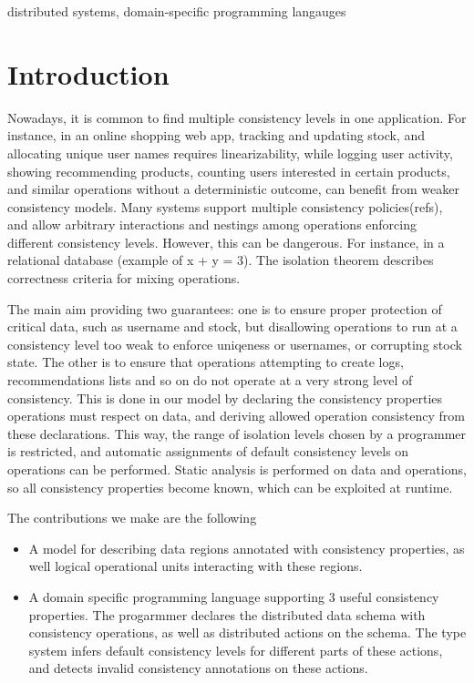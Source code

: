 \documentclass[preprint, numbers]{sigplanconf}
\begin{document}


\keywords
distributed systems, domain-specific programming langauges

\section{Introduction}
Nowadays, it is common to find multiple consistency levels in one application. For instance, in an online 
shopping web app, tracking and updating stock, and allocating unique user names requires linearizability, 
while logging user activity, showing recommending products, counting users
interested in certain products, and similar operations without a deterministic outcome,
can benefit from weaker consistency models. Many systems support multiple
consistency policies(refs), and allow arbitrary interactions and nestings among
operations enforcing different consistency levels. However, this can be
dangerous. For instance, in a relational database (example of x + y = 3). The
isolation theorem describes correctness criteria for mixing operations. 


The main aim providing two guarantees: one is to ensure proper protection of critical data, such
as username and stock, but disallowing operations to run at a consistency level
too weak to enforce uniqeness or usernames, or corrupting stock state. The other
is to ensure that operations attempting to create logs, recommendations lists
and so on do not operate at a very strong level of consistency. This is done in
our model by declaring the consistency properties operations must respect on
data, and deriving allowed operation consistency from these declarations. This
way, the range of isolation levels chosen by a programmer is restricted, and
automatic assignments of default consistency levels on operations can be
performed. Static analysis is performed on data and operations, so all
consistency properties become known, which can be exploited at runtime.



The contributions we make are the following 
\begin{itemize}
  \item A model for describing data regions annotated with consistency
    properties, as well logical operational units interacting with these
    regions.
  \item A domain specific programming language supporting 3 useful consistency
    properties. The progarmmer declares the distributed data schema with
    consistency operations, as well as distributed actions on the schema. The
    type system infers default consistency levels for different parts of these
    actions, and detects invalid consistency annotations on these actions. 
\end{itemize}
\end{document}
